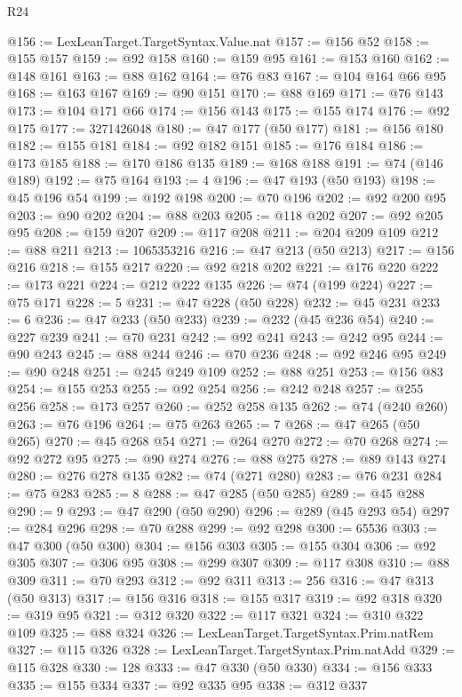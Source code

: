\begin{lexlean}{R24}
\begin{coremodule}
@156 := LexLeanTarget.TargetSyntax.Value.nat
@157 := @156 @52
@158 := @155 @157
@159 := @92 @158
@160 := @159 @95
@161 := @153 @160
@162 := @148 @161
@163 := @88 @162
@164 := @76 @83
@167 := @104 @164 @66 @95
@168 := @163 @167
@169 := @90 @151
@170 := @88 @169
@171 := @76 @143
@173 := @104 @171 @66
@174 := @156 @143
@175 := @155 @174
@176 := @92 @175
@177 := 3271426048
@180 := @47 @177 (@50 @177)
@181 := @156 @180
@182 := @155 @181
@184 := @92 @182 @151
@185 := @176 @184
@186 := @173 @185
@188 := @170 @186 @135
@189 := @168 @188
@191 := @74 (@146 @189)
@192 := @75 @164
@193 := 4
@196 := @47 @193 (@50 @193)
@198 := @45 @196 @54
@199 := @192 @198
@200 := @70 @196
@202 := @92 @200 @95
@203 := @90 @202
@204 := @88 @203
@205 := @118 @202
@207 := @92 @205 @95
@208 := @159 @207
@209 := @117 @208
@211 := @204 @209 @109
@212 := @88 @211
@213 := 1065353216
@216 := @47 @213 (@50 @213)
@217 := @156 @216
@218 := @155 @217
@220 := @92 @218 @202
@221 := @176 @220
@222 := @173 @221
@224 := @212 @222 @135
@226 := @74 (@199 @224)
@227 := @75 @171
@228 := 5
@231 := @47 @228 (@50 @228)
@232 := @45 @231
@233 := 6
@236 := @47 @233 (@50 @233)
@239 := @232 (@45 @236 @54)
@240 := @227 @239
@241 := @70 @231
@242 := @92 @241
@243 := @242 @95
@244 := @90 @243
@245 := @88 @244
@246 := @70 @236
@248 := @92 @246 @95
@249 := @90 @248
@251 := @245 @249 @109
@252 := @88 @251
@253 := @156 @83
@254 := @155 @253
@255 := @92 @254
@256 := @242 @248
@257 := @255 @256
@258 := @173 @257
@260 := @252 @258 @135
@262 := @74 (@240 @260)
@263 := @76 @196
@264 := @75 @263
@265 := 7
@268 := @47 @265 (@50 @265)
@270 := @45 @268 @54
@271 := @264 @270
@272 := @70 @268
@274 := @92 @272 @95
@275 := @90 @274
@276 := @88 @275
@278 := @89 @143 @274
@280 := @276 @278 @135
@282 := @74 (@271 @280)
@283 := @76 @231
@284 := @75 @283
@285 := 8
@288 := @47 @285 (@50 @285)
@289 := @45 @288
@290 := 9
@293 := @47 @290 (@50 @290)
@296 := @289 (@45 @293 @54)
@297 := @284 @296
@298 := @70 @288
@299 := @92 @298
@300 := 65536
@303 := @47 @300 (@50 @300)
@304 := @156 @303
@305 := @155 @304
@306 := @92 @305
@307 := @306 @95
@308 := @299 @307
@309 := @117 @308
@310 := @88 @309
@311 := @70 @293
@312 := @92 @311
@313 := 256
@316 := @47 @313 (@50 @313)
@317 := @156 @316
@318 := @155 @317
@319 := @92 @318
@320 := @319 @95
@321 := @312 @320
@322 := @117 @321
@324 := @310 @322 @109
@325 := @88 @324
@326 := LexLeanTarget.TargetSyntax.Prim.natRem
@327 := @115 @326
@328 := LexLeanTarget.TargetSyntax.Prim.natAdd
@329 := @115 @328
@330 := 128
@333 := @47 @330 (@50 @330)
@334 := @156 @333
@335 := @155 @334
@337 := @92 @335 @95
@338 := @312 @337

\end{coremodule}
\end{lexlean}
